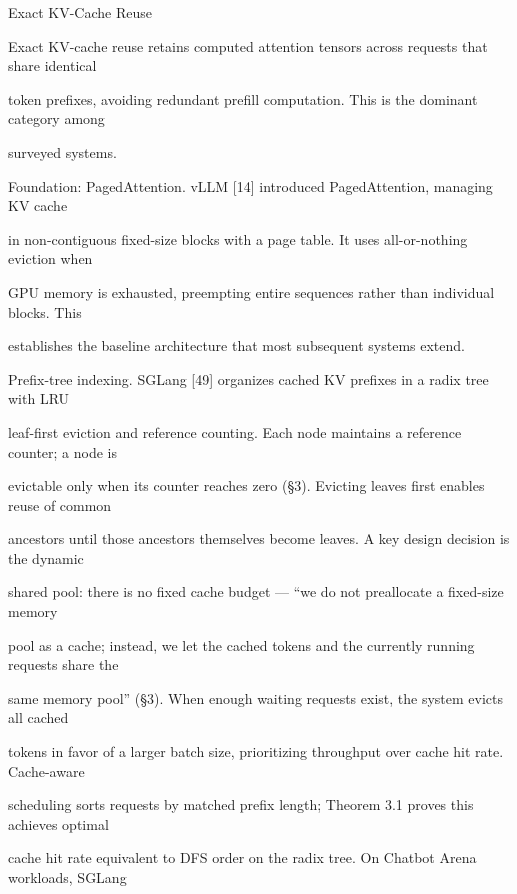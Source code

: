 \begin{flushleft}
\par\smallskip
{} Exact KV-Cache Reuse\par
\noindent Exact KV-cache reuse retains computed attention tensors across requests that share identical\par
\noindent token prefixes, avoiding redundant prefill computation. This is the dominant category among\par
\noindent surveyed systems.\par
\par\smallskip
\noindent Foundation: PagedAttention. vLLM [14] introduced PagedAttention, managing KV cache\par
\noindent in non-contiguous fixed-size blocks with a page table. It uses all-or-nothing eviction when\par
\noindent GPU memory is exhausted, preempting entire sequences rather than individual blocks. This\par
\noindent establishes the baseline architecture that most subsequent systems extend.\par
\par\smallskip
\noindent Prefix-tree indexing. SGLang [49] organizes cached KV prefixes in a radix tree with LRU\par
\noindent leaf-first eviction and reference counting. Each node maintains a reference counter; a node is\par
\noindent evictable only when its counter reaches zero (§3). Evicting leaves first enables reuse of common\par
\noindent ancestors until those ancestors themselves become leaves. A key design decision is the dynamic\par
\noindent shared pool: there is no fixed cache budget — “we do not preallocate a fixed-size memory\par
\noindent pool as a cache; instead, we let the cached tokens and the currently running requests share the\par
\noindent same memory pool” (§3). When enough waiting requests exist, the system evicts all cached\par
\noindent tokens in favor of a larger batch size, prioritizing throughput over cache hit rate. Cache-aware\par
\noindent scheduling sorts requests by matched prefix length; Theorem 3.1 proves this achieves optimal\par
\noindent cache hit rate equivalent to DFS order on the radix tree. On Chatbot Arena workloads, SGLang\par

\end{flushleft}
